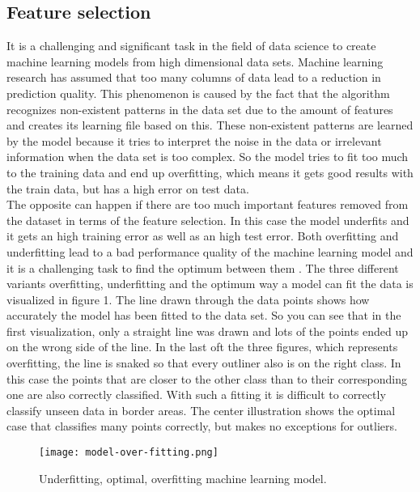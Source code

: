 \documentclass[../masterarbeit.tex]{subfiles}
\begin{document}
	



\subsection{Feature selection}

It is a challenging and significant task in the field of data science to create machine learning models from high dimensional data sets. Machine learning research has assumed that too many columns of data lead to a reduction in prediction quality. This phenomenon is caused by the fact that the algorithm recognizes non-existent patterns in the data set due to the amount of features and creates its learning file based on this. These non-existent patterns are learned by the model because it tries to interpret the noise in the data or irrelevant information when the data set is too complex. So the model tries to fit too much to the training data and end up overfitting, which means it gets good results with the train data, but has a high error on test data. \autocite[]{ibm-overfitting:2022} \\
The opposite can happen if there are too much important features removed from the dataset in terms of the feature selection. In this case the model underfits and it gets an high training error as well as an high test error. \autocite[]{ibm-overfitting:2022}
Both overfitting and underfitting lead to a bad performance quality of the machine learning model and it is a challenging task to find the optimum between them \textcite[]{SUBASI202091}. The three different variants overfitting, underfitting and the optimum way a model can fit the data is visualized in figure 1. The line drawn through the data points shows how accurately the model has been fitted to the data set. So you can see that in the first visualization, only a straight line was drawn and lots of the points ended up on the wrong side of the line. In the last oft the three figures, which represents overfitting, the line is snaked so that every outliner also is on the right class. In this case the points that are closer to the other class than to their corresponding one are also correctly classified. With such a fitting it is difficult to correctly classify unseen data in border areas. The center illustration shows the optimal case that classifies many points correctly, but makes no exceptions for outliers. \\
\begin{figure}[h]
    \centering
    \texttt{[image: model-over-fitting.png]}
    \caption{ Underfitting, optimal, overfitting machine learning model.}
\end{figure} 
\end{document}
